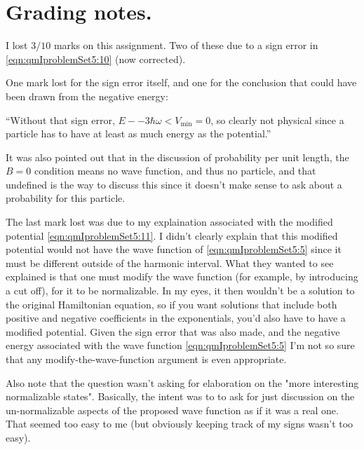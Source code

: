 \section{Grading notes.}

I lost $3/10$ marks on this assignment.  Two of these due to a sign error in \ref{eqn:qmIproblemSet5:10} (now corrected).

One mark lost for the sign error itself, and one for the conclusion that could have been drawn from the negative energy:

``Without that sign error, $E - -3 \hbar \omega < V_{\text{min}} = 0$, so clearly not physical since a particle has to have at least as much energy as the potential.''

It was also pointed out that in the discussion of probability per unit length, the $B=0$ condition means no wave function, and thus no particle, and that undefined is the way to discuss this since it doesn't make sense to ask about a probability for this particle.

The last mark lost was due to my explaination associated with the modified potential \ref{eqn:qmIproblemSet5:11}.  I didn't clearly explain that this modified potential would not have the wave function of \ref{eqn:qmIproblemSet5:5} since it must be different outside of the harmonic interval.  What they wanted to see explained is that one must modify the wave function (for example, by introducing a cut off), for it to be normalizable.  In my eyes, it then wouldn't be a solution to the original Hamiltonian equation, so if you want solutions that include both positive and negative coefficients in the exponentials, you'd also have to have a modified potential.  Given the sign error that was also made, and the negative energy associated with the wave function \ref{eqn:qmIproblemSet5:5} I'm not so sure that any modify-the-wave-function argument is even appropriate.

Also note that the question wasn't asking for elaboration on the "more interesting normalizable states".  Basically, the intent was to to ask for just discussion on the un-normalizable aspects of the proposed wave function as if it was a real one.  That seemed too easy to me (but obviously keeping track of my signs wasn't too easy).

\EndNoBibArticle
